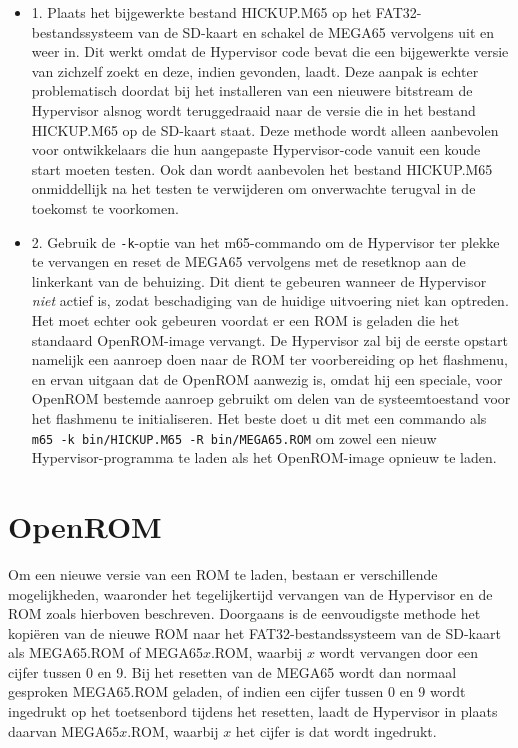 \begin{itemize}
	\item 1. Plaats het bijgewerkte bestand HICKUP.M65 op het FAT32-bestandssysteem van de SD-kaart en schakel de MEGA65 vervolgens uit en weer in. Dit werkt omdat de Hypervisor code bevat die een bijgewerkte versie van zichzelf zoekt en deze, indien gevonden, laadt. Deze aanpak is echter problematisch doordat bij het installeren van een nieuwere bitstream de Hypervisor alsnog wordt teruggedraaid naar de versie die in het bestand HICKUP.M65 op de SD-kaart staat. Deze methode wordt alleen aanbevolen voor ontwikkelaars die hun aangepaste Hypervisor-code vanuit een koude start moeten testen. Ook dan wordt aanbevolen het bestand HICKUP.M65 onmiddellijk na het testen te verwijderen om onverwachte terugval in de toekomst te voorkomen.	\item 2. Gebruik de {\tt -k}-optie van het m65-commando om de Hypervisor ter plekke te vervangen en reset de MEGA65 vervolgens met de resetknop aan de linkerkant van de behuizing. Dit dient te gebeuren wanneer de Hypervisor {\em niet} actief is, zodat beschadiging van de huidige uitvoering niet kan optreden. Het moet echter ook gebeuren voordat er een ROM is geladen die het standaard OpenROM-image vervangt. De Hypervisor zal bij de eerste opstart namelijk een aanroep doen naar de ROM ter voorbereiding op het flashmenu, en ervan uitgaan dat de OpenROM aanwezig is, omdat hij een speciale, voor OpenROM bestemde aanroep gebruikt om delen van de systeemtoestand voor het flashmenu te initialiseren. Het beste doet u dit met een commando als {\tt m65 -k bin/HICKUP.M65 -R bin/MEGA65.ROM} om zowel een nieuw Hypervisor-programma te laden als het OpenROM-image opnieuw te laden.
\end{itemize}

\section{OpenROM}

Om een nieuwe versie van een ROM te laden, bestaan er verschillende mogelijkheden, waaronder het tegelijkertijd vervangen van de Hypervisor en de ROM zoals hierboven beschreven. Doorgaans is de eenvoudigste methode het kopiëren van de nieuwe ROM naar het FAT32-bestandssysteem van de SD-kaart als MEGA65.ROM of MEGA65$x$.ROM, waarbij $x$ wordt vervangen door een cijfer tussen 0 en 9. Bij het resetten van de MEGA65 wordt dan normaal gesproken MEGA65.ROM geladen, of indien een cijfer tussen 0 en 9 wordt ingedrukt op het toetsenbord tijdens het resetten, laadt de Hypervisor in plaats daarvan MEGA65$x$.ROM, waarbij $x$ het cijfer is dat wordt ingedrukt.
